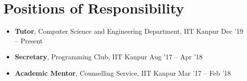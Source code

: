 \newcommand{\por}[3]{\textbf{#1}, #2 \hfill #3}

\section*{Positions of Responsibility}
\begin{itemize}

\setlength\itemsep{0pt}
\item \por{Tutor}{Computer Science and Engineering Department, IIT Kanpur}{Dec '19 -- Present}%
\item \por{Secretary}{Programming Club, IIT Kanpur}{Aug '17 -- Apr '18}%
\item \por{Academic Mentor}{Counselling Service, IIT Kanpur}{Mar '17 -- Feb '18}%

\end{itemize}
